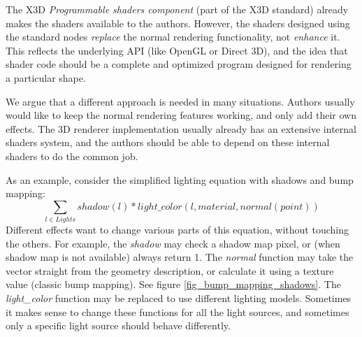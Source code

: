 \documentclass{egpubl}
\begin{document}
The X3D \textit{Programmable shaders component} \cite{x3d:shaders} (part of the X3D standard)
already makes
the shaders available to the authors. However, the shaders designed using
the standard nodes
\textit{replace} the normal rendering functionality, not \textit{enhance} it.
This reflects the underlying API (like OpenGL or Direct 3D),
and the idea that shader code should be a complete and optimized program
designed for rendering a particular shape.

We argue that a different approach is needed in many situations.
Authors usually would like to keep the normal rendering features working,
and only add their own effects. The 3D renderer
implementation usually already has an extensive internal shaders system,
and the authors should be able to depend on these internal shaders
to do the common job.

As an example, consider the simplified lighting equation with shadows
and bump mapping:
$$ \sum_{l\in Lights} shadow(l) * light\_color(l, material, normal(point)) $$
Different effects want to change various parts of this equation,
without touching the others.
For example, the \textit{shadow} may check a shadow map pixel,
or (when shadow map is not available) always return 1.
The \textit{normal} function may take the vector straight from
the geometry description, or calculate it using a texture value (classic bump mapping).
See figure \ref{fig_bump_mapping_shadows}.
The \textit{light\_color} function may be replaced to use different
lighting models.
Sometimes it makes sense to change these functions
for all the light sources, and sometimes only a specific light source
should behave differently.
\end{document}
